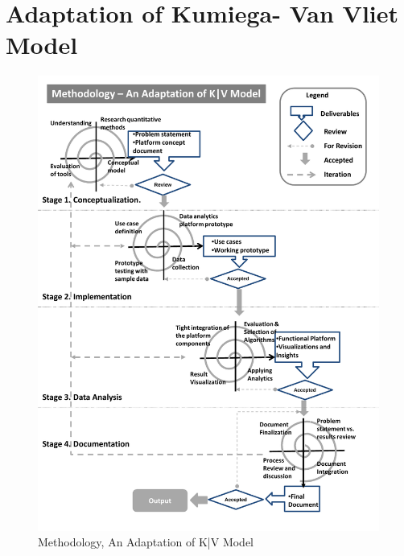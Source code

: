  \section{Adaptation of Kumiega- Van Vliet Model}
 \begin{figure}[ht]
   \begin{center}
     \includegraphics[width=\textwidth]{images/kv_method.pdf}
     \caption{Methodology, An Adaptation of K|V Model}
     \label{fig:kv}
   \end{center}
 \end{figure}  
